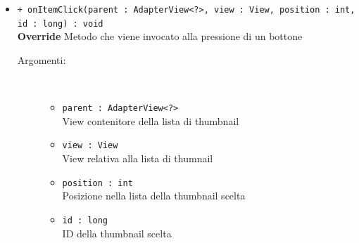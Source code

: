 \documentclass[../DefinizioneDiProdotto.tex]{subfiles}
\begin{document}
\begin{description}
\begin{itemize}
\begin{description}
		\end{description}
		\item \texttt{+ onItemClick(parent : AdapterView<?>, view : View, position : int, id : long) : void}\\
		\textbf{Override} Metodo che viene invocato alla pressione di un bottone
		\begin{description}
			\item[Argomenti:] \
			\begin{itemize}
				\item \texttt{parent : AdapterView<?>}\\
				View contenitore della lista di thumbnail\item \texttt{view : View}\\
				View relativa alla lista di thumnail\item \texttt{position : int}\\
				Posizione nella lista della thumbnail scelta\item \texttt{id : long}\\
				ID della thumbnail scelta\end{itemize}
		\end{description}
	\end{itemize}
\end{description}
\end{document}
